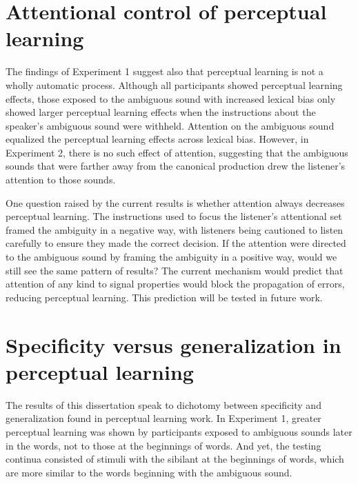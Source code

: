 \section{Attentional control of perceptual learning}

The findings of Experiment 1 suggest also that perceptual learning is not a wholly automatic process.  
Although all participants showed perceptual learning effects, those exposed to the ambiguous sound with increased lexical bias only showed larger perceptual learning effects when the instructions about the speaker's ambiguous sound were withheld.  
Attention on the ambiguous sound equalized the perceptual learning effects across lexical bias.
However, in Experiment 2, there is no such effect of attention, suggesting that the ambiguous sounds that were farther away from the canonical production drew the listener's attention to those sounds.

One question raised by the current results is whether attention always decreases perceptual learning.  
The instructions used to focus the listener's attentional set framed the ambiguity in a negative way, with listeners being cautioned to listen carefully to ensure they made the correct decision.  
If the attention were directed to the ambiguous sound by framing the ambiguity in a positive way, would we still see the same pattern of results?
The current mechanism would predict that attention of any kind to signal properties would block the propagation of errors, reducing perceptual learning.
This prediction will be tested in future work.

\section{Specificity versus generalization in perceptual learning}

The results of this dissertation speak to dichotomy between specificity and generalization found in perceptual learning work. 
In Experiment 1, greater perceptual learning was shown by participants exposed to ambiguous sounds later in the words, not to those at the beginnings of words. 
And yet, the testing continua consisted of stimuli with the sibilant at the beginnings of words, which are more similar to the words beginning with the ambiguous sound.

